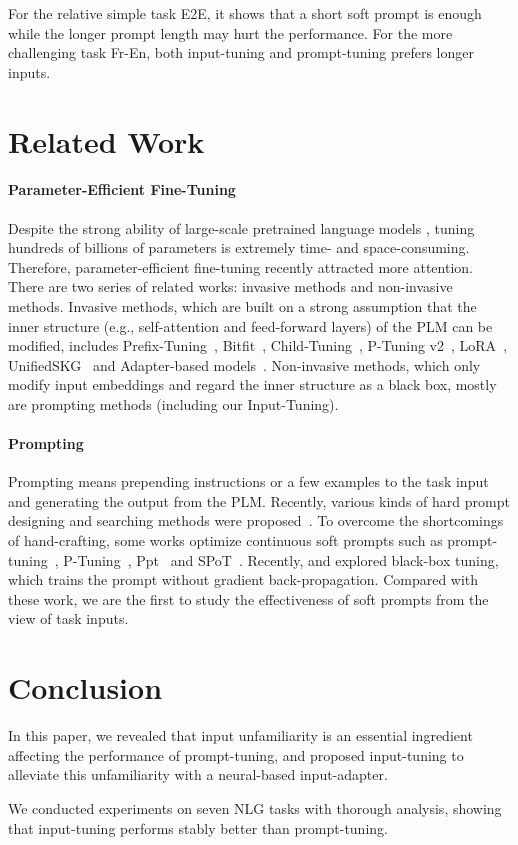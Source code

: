For the relative simple task E2E, it shows that a short soft prompt is enough while the longer prompt length may hurt the performance. For the more challenging task Fr-En, both input-tuning and prompt-tuning prefers longer inputs.

\section {Related Work}

\paragraph{Parameter-Efficient Fine-Tuning} Despite the strong ability of large-scale pretrained language models \cite{radford2018improving, devlin2019bert, liu2019roberta, raffel2020exploring}, tuning hundreds of billions of parameters is extremely time- and space-consuming. Therefore, parameter-efficient fine-tuning recently attracted more attention. There are two series of related works: invasive methods and non-invasive methods. Invasive methods, which are built on a strong assumption that the inner structure (e.g., self-attention and feed-forward layers) of the PLM can be modified, includes Prefix-Tuning~\cite{li2021prefix}, Bitfit~\cite{ben2021bitfit}, Child-Tuning~\cite{xu2021raise}, P-Tuning v2~\cite{liu2021p-v2}, LoRA~\cite{hu2021lora}, UnifiedSKG~\cite{xie2022unifiedskg} and Adapter-based models~\cite{rebuffi2017learning, houlsby2019parameter, lin2020exploring, he2021effectiveness, pfeiffer2021adapterfusion}. Non-invasive methods, which only modify input embeddings and regard the inner structure as a black box, mostly are prompting methods (including our Input-Tuning).

\paragraph{Prompting}
Prompting means prepending instructions or a few examples to the task input and generating the output from the PLM. Recently, various kinds of hard prompt designing and searching methods were proposed~\cite{jiang2020can, shin2020autoprompt, schick2020s, gao2020making}. To overcome the shortcomings of hand-crafting, some works optimize continuous soft prompts such as prompt-tuning~\cite{lester2021power}, P-Tuning~\cite{liu2021gpt}, Ppt~\cite{gu2021ppt} and SPoT~\cite{vu2021spot}. Recently, \citet{sun2022black} and \citet{diao2022black} explored black-box tuning, which trains the prompt without gradient back-propagation. Compared with these work, we are the first to study the effectiveness of soft prompts from the view of task inputs.

\section{Conclusion}
In this paper, we revealed that input unfamiliarity is an essential ingredient affecting the performance of prompt-tuning, and proposed input-tuning to alleviate this unfamiliarity with a neural-based input-adapter.

We conducted experiments on seven NLG tasks with thorough analysis, showing that input-tuning performs stably better than prompt-tuning.


